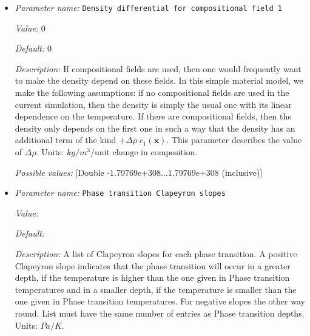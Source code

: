 \begin{itemize}
{\it Value:} true


{\it Default:} true


{\it Description:} Whether to list phase transitions by depth or pressure. If this parameter is true,then the input file will use Phase transitions depths and Phase transition widthsto define the phase transition. If it is false, the parameter file will read inphase transition data from Phase transition pressures andPhase transition pressure widths.


{\it Possible values:} [Bool]
\item {\it Parameter name:} {\tt Density differential for compositional field 1}
\label{parameters:Material model/Latent heat/Density differential for compositional field 1}


{\it Value:} 0


{\it Default:} 0


{\it Description:} If compositional fields are used, then one would frequently want to make the density depend on these fields. In this simple material model, we make the following assumptions: if no compositional fields are used in the current simulation, then the density is simply the usual one with its linear dependence on the temperature. If there are compositional fields, then the density only depends on the first one in such a way that the density has an additional term of the kind $+\Delta \rho \; c_1(\mathbf x)$. This parameter describes the value of $\Delta \rho$. Units: $kg/m^3/\textrm{unit change in composition}$.


{\it Possible values:} [Double -1.79769e+308...1.79769e+308 (inclusive)]
\item {\it Parameter name:} {\tt Phase transition Clapeyron slopes}
\label{parameters:Material model/Latent heat/Phase transition Clapeyron slopes}


{\it Value:} 


{\it Default:} 


{\it Description:} A list of Clapeyron slopes for each phase transition. A positive Clapeyron slope indicates that the phase transition will occur in a greater depth, if the temperature is higher than the one given in Phase transition temperatures and in a smaller depth, if the temperature is smaller than the one given in Phase transition temperatures. For negative slopes the other way round. List must have the same number of entries as Phase transition depths. Units: $Pa/K$.



\end{itemize}
